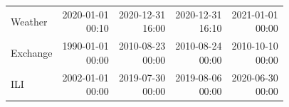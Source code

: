 \begin{table}[!htbp]
\begin{tabular}{lrrrr}
Weather & \shortstack{2020-01-01\\00:10} & \shortstack{2020-12-31\\16:00} & \shortstack{2020-12-31\\16:10} & \shortstack{2021-01-01\\00:00} \\
Exchange & \shortstack{1990-01-01\\00:00} & \shortstack{2010-08-23\\00:00} & \shortstack{2010-08-24\\00:00} & \shortstack{2010-10-10\\00:00} \\
ILI & \shortstack{2002-01-01\\00:00} & \shortstack{2019-07-30\\00:00} & \shortstack{2019-08-06\\00:00} & \shortstack{2020-06-30\\00:00} \\
\hline
\end{tabular}
\end{table}
